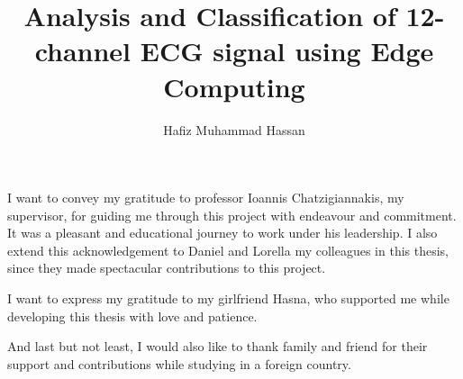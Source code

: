 \documentclass[LaM,binding=0.6cm]{sapthesis}
\title{Analysis and Classification of 12-channel ECG signal using Edge Computing}
\author{Hafiz Muhammad Hassan}
\begin{document}
\frontmatter

\maketitle
\dedication{Dedicated to God, my family and my love one}





\makeatletter
\renewcommand{\SAP@AbstractLabel}{Abstract}
\makeatother

\begin{acknowledgments}
\parskip=12pt

I want to convey my gratitude to professor Ioannis Chatzigiannakis, my supervisor, for guiding me through this project with endeavour and commitment. It was a pleasant and educational journey to work under his leadership. I also extend this acknowledgement to Daniel and Lorella my colleagues in this thesis, since they made spectacular contributions to this project.

I want to express my gratitude to my girlfriend Hasna, who supported me while developing this thesis with love and patience.

And last but not least, I would also like to thank family and friend for their support and contributions while studying in a foreign country.



\end{acknowledgments}

\tableofcontents

\mainmatter

\parskip=5pt













\backmatter
\cleardoublepage
{}
\end{document}
